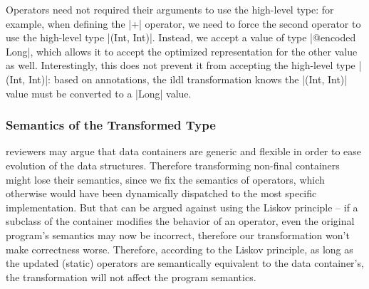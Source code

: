 Operators need not required their arguments to use the high-level type: for example, when defining the |+| operator, we need to force the second operator to use the high-level type |(Int, Int)|. Instead, we accept a value of type |@encoded Long|, which allows it to accept the optimized representation for the other value as well. Interestingly, this does not prevent it from accepting the high-level type |(Int, Int)|: based on annotations, the ildl transformation knows the |(Int, Int)| value must be converted to a |Long| value.

\subsubsection{Semantics of the Transformed Type}
reviewers may argue that data containers are generic and flexible in order to ease evolution of the data structures. Therefore transforming non-final containers might lose their semantics, since we fix the semantics of operators, which otherwise would have been dynamically dispatched to the most specific implementation. But that can be argued against using the Liskov principle -- if a subclass of the container modifies the behavior of an operator, even the original program's semantics may now be incorrect, therefore our transformation won't make correctness worse. Therefore, according to the Liskov principle, as long as the updated (static) operators are semantically equivalent to the data container's, the transformation will not affect the program semantics.

